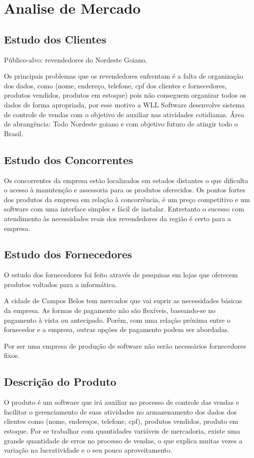\documentclass[chapter=TITLE,12pt,oneside,a4paper,english,french,sumario=tradicional,spanish,brazil,]{abntex2}
\begin{document}
\section{Analise de Mercado}
\subsection{Estudo dos Clientes}
Público-alvo: revendedores do Nordeste Goiano.

Os principais problemas que os revendedores enfrentam é a falta de organização dos dados, como (nome, endereço, telefone, cpf dos clientes e fornecedores, produtos vendidos, produtos em estoque) pois não conseguem organizar todos os dados de forma apropriada, por esse motivo a WLL Software desenvolve sistema de controle de vendas com o objetivo de auxiliar nas atividades cotidianas.
Área de abrangência: Todo Nordeste goiano e com objetivo futuro de atingir todo o
Brasil.


\subsection{Estudo dos Concorrentes}
Os concorrentes da empresa estão localizados em estados distantes o que dificulta o acesso à manutenção e assessoria para os produtos oferecidos. Os pontos fortes dos produtos da empresa em relação à concorrência, é um preço competitivo e um software com uma interface simples e fácil de instalar. Entretanto o sucesso com atendimento às necessidades reais dos revendedores da região é certo para a empresa.

\subsection{Estudo dos Fornecedores}
O estudo dos fornecedores foi feito através de pesquisas em lojas que oferecem produtos voltados para a informática.

A cidade de Campos Belos tem mercados que vai suprir as necessidades básicas da empresa. As formas de pagamento não são flexíveis, baseando-se no pagamento à vista ou antecipado. Porém, com uma relação próxima entre o fornecedor e a empresa, outras opções de pagamento podem ser abordadas.

Por ser uma empresa de produção de software não serão necessários fornecedores fixos.

\subsection{Descrição do Produto}
O produto é um software que irá auxiliar no processo de controle das vendas e facilitar o gerenciamento de suas atividades no armazenamento dos dados dos clientes como (nome, endereços, telefone, cpf), produtos vendidos, produto em estoque. Por se trabalhar com quantidades variáveis de mercadoria, existe uma grande quantidade de erros no processo de vendas, o que explica muitas vezes a variação na lucratividade e o seu pouco aproveitamento.
\end{document}
